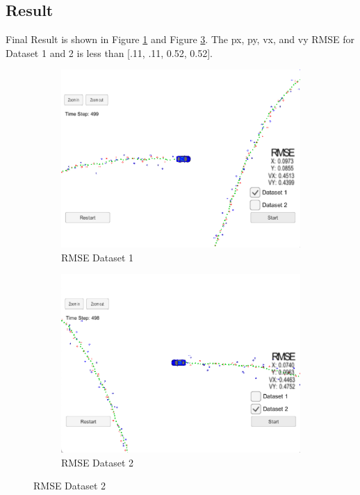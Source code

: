 \documentclass{article}
\begin{document}
\subsection{Result} 
Final Result is shown in Figure \ref{fig3a} and Figure \ref{fig3b}. The px, py, vx, and vy RMSE for Dataset 1 and 2 is less than [.11, .11, 0.52, 0.52].

\begin{figure}
     \centering
     \begin{subfigure}[b]{0.4\textwidth}
         \centering
         \includegraphics[width=\textwidth]{Test1.png}
         \caption{RMSE Dataset 1}
         \label{fig3a}
     \end{subfigure}
     \hfill
     \begin{subfigure}[b]{0.4\textwidth}
         \centering
         \includegraphics[width=\textwidth]{Test2.png}
         \caption{RMSE Dataset 2}
         \label{fig3b}
     \end{subfigure}
\end{figure}
\end{document}
